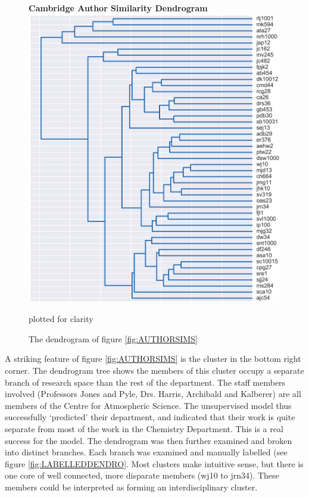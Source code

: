 \begin{center}
\begin{figure}[H]
  \centering
  \textbf{Cambridge Author Similarity Dendrogram}
    \includegraphics[width=\textwidth]{Analysis/dendro.png}
    \caption[Cambridge Author Similarity Dendrogram]{The dendrogram of figure \ref{fig:AUTHORSIMS}} plotted for clarity
\end{figure} 
\label{fig:DENDRO}

\end{center}
A striking feature of figure \ref{fig:AUTHORSIMS} is the cluster in the bottom right corner. The dendrogram tree shows the members of this cluster occupy a separate branch of research space than the rest of the department. The staff members involved (Professors Jones and Pyle, Drs. Harris, Archibald and Kalberer) are all members of the Centre for Atmospheric Science. The unsupervised model thus successfully `predicted' their department, and indicated that their work is quite separate from most of the work in the Chemistry Department. This is a real success for the model. The dendrogram was then further examined and broken into distinct branches. Each branch was examined and manually labelled (see figure \ref{fig:LABELLEDDENDRO}. Most clusters make intuitive sense, but there is one core of well connected, more disparate members (wj10 to jrn34). These members could be interpreted as forming an interdisciplinary cluster.  
